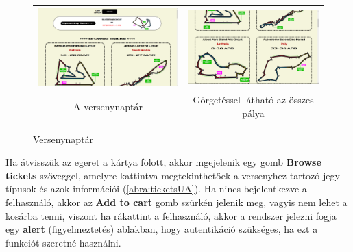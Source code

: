 \begin{figure}[!h]
	\centering
	\begin{tabular}{cc}
	\includegraphics[scale=0.15]{images/schedule1} &
	\includegraphics[scale=0.15]{images/schedule2} \\
	A versenynaptár & Görgetéssel látható az összes pálya
	\end{tabular}
	\caption{Versenynaptár}
	\label{abra:schedule}
\end{figure}

Ha átvisszük az egeret a kártya fölott, akkor mgejelenik egy gomb \textbf{Browse tickets} szöveggel, amelyre kattintva megtekinthetőek a versenyhez tartozó jegy típusok és azok információi (\ref{abra:ticketsUA}). Ha nincs bejelentkezve a felhasználó, akkor az \textbf{Add to cart} gomb szürkén jelenik meg, vagyis nem lehet a kosárba tenni, viszont ha rákattint a felhasználó, akkor a rendszer jelezni fogja egy \textbf{alert} (figyelmeztetés) ablakban, hogy autentikáció szükséges, ha ezt a funkciót szeretné használni.

